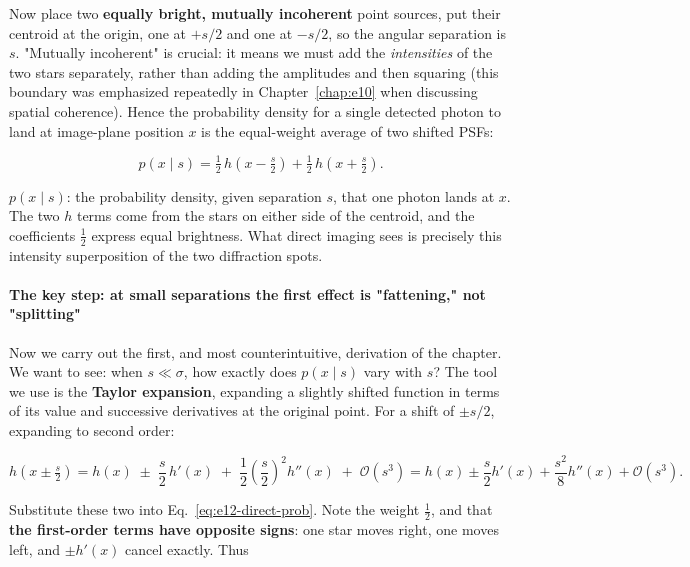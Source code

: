 Now place two \textbf{equally bright, mutually incoherent} point sources, put their centroid at the origin, one at $+s/2$ and one at $-s/2$, so the angular separation is $s$. "Mutually incoherent" is crucial: it means we must add the \emph{intensities} of the two stars separately, rather than adding the amplitudes and then squaring (this boundary was emphasized repeatedly in Chapter~\ref{chap:e10} when discussing spatial coherence). Hence the probability density for a single detected photon to land at image-plane position $x$ is the equal-weight average of two shifted PSFs:

\begin{equation}
  p(x\mid s)=\tfrac12\,h\!\left(x-\tfrac{s}{2}\right)
            +\tfrac12\,h\!\left(x+\tfrac{s}{2}\right).
  \label{eq:e12-direct-prob}
\end{equation}
\begin{formulaexplain}
$p(x\mid s)$: the probability density, given separation $s$, that one photon lands at $x$. The two $h$ terms come from the stars on either side of the centroid, and the coefficients $\tfrac12$ express equal brightness. What direct imaging sees is precisely this intensity superposition of the two diffraction spots.
\end{formulaexplain}

\paragraph{The key step: at small separations the first effect is "fattening," not "splitting"}
\label{sec:e12-taylor}

Now we carry out the first, and most counterintuitive, derivation of the chapter. We want to see: when $s\ll\sigma$, how exactly does $p(x\mid s)$ vary with $s$? The tool we use is the \textbf{Taylor expansion}, expanding a slightly shifted function in terms of its value and successive derivatives at the original point. For a shift of $\pm s/2$, expanding to second order:

\[
  h\!\left(x\pm\tfrac{s}{2}\right)
  =h(x)\;\pm\;\frac{s}{2}\,h'(x)
   \;+\;\frac{1}{2}\left(\frac{s}{2}\right)^{2}h''(x)
   \;+\;\mathcal{O}(s^{3})
  =h(x)\pm\frac{s}{2}h'(x)+\frac{s^{2}}{8}h''(x)+\mathcal{O}(s^{3}).
\]

Substitute these two into Eq.~\eqref{eq:e12-direct-prob}. Note the weight $\tfrac12$, and that \textbf{the first-order terms have opposite signs}: one star moves right, one moves left, and $\pm h'(x)$ cancel exactly. Thus

